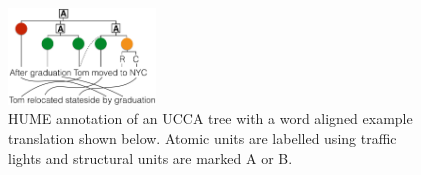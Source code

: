 \documentclass[11pt,letterpaper]{article}
\newcommand{\com}[1]{}
\newcommand{\figref}[1]{Figure~\ref{#1}}
\begin{document}
\com{
In non-configurational languages, the relationship between the
governing and dependent units is often expressed using morphological
properties of the dependants instead of their ordering
(this holds especially for the verb and its modifiers,
less so for components of noun phrases). Errors in morphology
should be expressed on the atomic units, so HUME can behave differently
on configurational vs. non-configurational languages.
}




\begin{figure}
    \begin{center}
    \includegraphics[width=0.35\textwidth]{ucca-tree-mteval-v2.png}
    \end{center}
  \caption{\label{fig:hume_tree_v2}
     HUME annotation of an UCCA tree with a word aligned example translation shown below. 
Atomic units are labelled using traffic lights and structural units are marked A or B.}
\end{figure}
\end{document}
